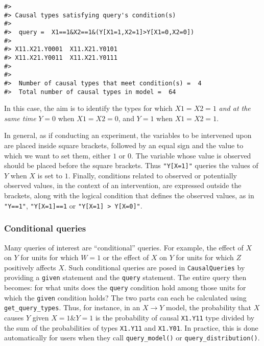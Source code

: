 \documentclass[
  11pt,
  article]{jss}
\begin{document}
\begin{verbatim}
#> 
#> Causal types satisfying query's condition(s)  
#> 
#>  query =  X1==1&X2==1&(Y[X1=1,X2=1]>Y[X1=0,X2=0]) 
#> 
#> X11.X21.Y0001  X11.X21.Y0101
#> X11.X21.Y0011  X11.X21.Y0111
#> 
#> 
#>  Number of causal types that meet condition(s) =  4
#>  Total number of causal types in model =  64
\end{verbatim}

In this case, the aim is to identify the types for which \(X1=X2=1\)
\emph{and at the same time} \(Y=0\) when \(X1 = X2 = 0\), and \(Y = 1\)
when \(X1 = X2 = 1\).

In general, as if conducting an experiment, the variables to be
intervened upon are placed inside square brackets, followed by an equal
sign and the value to which we want to set them, either \(1\) or \(0\).
The variable whose value is observed should be placed before the square
brackets. Thus \texttt{"Y{[}X=1{]}"} queries the values of \(Y\) when
\(X\) is set to \(1\). Finally, conditions related to observed or
potentially observed values, in the context of an intervention, are
expressed outside the brackets, along with the logical condition that
defines the observed values, as in \texttt{"Y==1"},
\texttt{"Y{[}X=1{]}==1} or
\texttt{"Y{[}X=1{]}\ \textgreater{}\ Y{[}X=0{]}"}.

\subsubsection{Conditional queries}\label{conditional-queries}

Many queries of interest are ``conditional'' queries. For example, the
effect of \(X\) on \(Y\) for units for which \(W= 1\) or the effect of
\(X\) on \(Y\) for units for which \(Z\) positively affects \(X\). Such
conditional queries are posed in \texttt{CausalQueries} by providing a
\texttt{given} statement and the \texttt{query} statement. The entire
query then becomes: for what units does the \texttt{query} condition
hold among those units for which the \texttt{given} condition holds? The
two parts can each be calculated using \texttt{get\_query\_types}. Thus,
for instance, in an \(X \rightarrow Y\) model, the probability that
\(X\) causes \(Y\) given \(X=1 \& Y=1\) is the probability of causal
\texttt{X1.Y11} type divided by the sum of the probabilities of types
\texttt{X1.Y11} and \texttt{X1.Y01}. In practice, this is done
automatically for users when they call \texttt{query\_model()} or
\texttt{query\_distribution()}.
\end{document}
